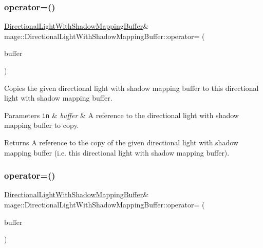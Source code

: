 \subsubsection{\texorpdfstring{operator=()}{operator=()}\hspace{0.1cm}{\footnotesize\ttfamily [1/2]}}
{\footnotesize\ttfamily \hyperlink{structmage_1_1_directional_light_with_shadow_mapping_buffer}{Directional\+Light\+With\+Shadow\+Mapping\+Buffer}\& mage\+::\+Directional\+Light\+With\+Shadow\+Mapping\+Buffer\+::operator= (\begin{DoxyParamCaption}\item[{const \hyperlink{structmage_1_1_directional_light_with_shadow_mapping_buffer}{Directional\+Light\+With\+Shadow\+Mapping\+Buffer} \&}]{buffer }\end{DoxyParamCaption})\hspace{0.3cm}{\ttfamily [default]}}

Copies the given directional light with shadow mapping buffer to this directional light with shadow mapping buffer.


\begin{DoxyParams}[1]{Parameters}
\mbox{\tt in}  & {\em buffer} & A reference to the directional light with shadow mapping buffer to copy. \\
\hline
\end{DoxyParams}
\begin{DoxyReturn}{Returns}
A reference to the copy of the given directional light with shadow mapping buffer (i.\+e. this directional light with shadow mapping buffer). 
\end{DoxyReturn}
\hypertarget{structmage_1_1_directional_light_with_shadow_mapping_buffer_a19765ecbd12d4f346269a22791d5347c}{}\label{structmage_1_1_directional_light_with_shadow_mapping_buffer_a19765ecbd12d4f346269a22791d5347c} 
\subsubsection{\texorpdfstring{operator=()}{operator=()}\hspace{0.1cm}{\footnotesize\ttfamily [2/2]}}
{\footnotesize\ttfamily \hyperlink{structmage_1_1_directional_light_with_shadow_mapping_buffer}{Directional\+Light\+With\+Shadow\+Mapping\+Buffer}\& mage\+::\+Directional\+Light\+With\+Shadow\+Mapping\+Buffer\+::operator= (\begin{DoxyParamCaption}\item[{\hyperlink{structmage_1_1_directional_light_with_shadow_mapping_buffer}{Directional\+Light\+With\+Shadow\+Mapping\+Buffer} \&\&}]{buffer }\end{DoxyParamCaption})\hspace{0.3cm}{\ttfamily [default]}}

